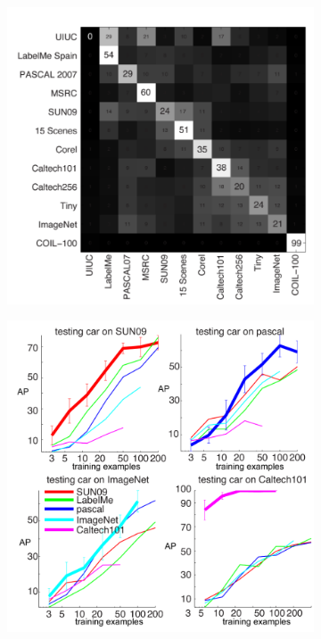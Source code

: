 \begin{figure}[H]
    \centering
    \begin{subfigure}[b]{0.35\textwidth}
        \centering
        \includegraphics[width=\textwidth]{img/introduction/dataset_bias_confusion.png}
    \end{subfigure}
    \hspace{1cm}
    \begin{subfigure}[b]{0.32\textwidth}
        \centering
        \includegraphics[width=\textwidth]{img/introduction/dataset_bias_cross_generalization.png}

\end{subfigure}
\end{figure}
